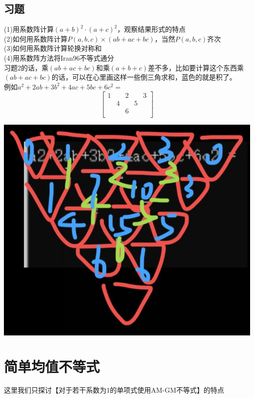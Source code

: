 \documentclass[UTF8]{ctexart}
\begin{document}
\subsection{习题}
\noindent (1)用系数阵计算$ (a+b)^{2}·(a+c)^{2} $，观察结果形式的特点\\
(2)如何用系数阵计算$ P(a,b,c)×(ab+ac+bc) $，当然$ P(a,b,c) $齐次\\
(3)如何用系数阵计算轮换对称和\\
(4)用系数阵方法将Iran96不等式通分\\
习题2的话，乘$ (ab+ac+bc) $和乘$ (a+b+c) $差不多，比如要计算这个东西乘$ (ab+ac+bc) $的话，可以在心里画这样一些倒三角求和，蓝色的就是积了。\\
例如$ a^{2}+2ab+3b^{2}+4ac+5bc+6c^{2}=$
\renewcommand*{\arraystretch}{1.732}\[
\left[\begin{matrix}
	1& &2& &3\\
	&4& &5&\\
	& &6& &\\
\end{matrix}\right]
\]
\begin{center}
	\includegraphics[width=0.35\linewidth]{0110}
\end{center}
\section{简单均值不等式}
这里我们只探讨【对于若干系数为1的单项式使用AM-GM不等式】的特点
\end{document}
